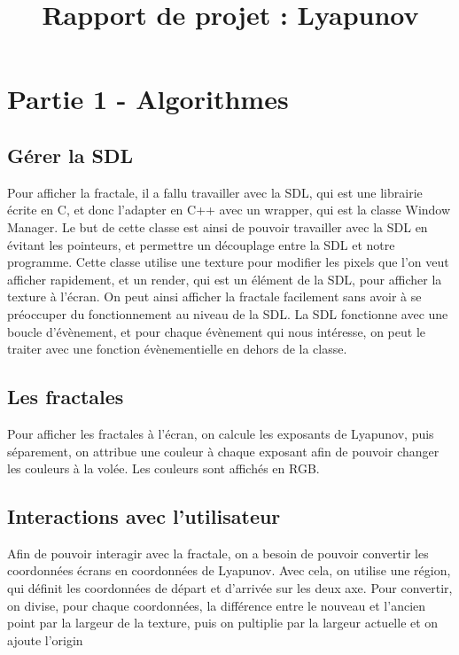 \documentclass{article}
\title{Rapport de projet : Lyapunov}
\date{}
\begin{document}
    \vspace*{-2pt}
    {\let\newpage\relax\maketitle} \thispagestyle{fancy}


\section* {Partie 1 - Algorithmes}
    \subsection*{Gérer la SDL}
    Pour afficher la fractale, il a fallu travailler avec la SDL, qui est une librairie écrite en C, et donc l'adapter en C++ avec un wrapper, qui est la classe Window Manager.
    Le but de cette classe est ainsi de pouvoir travailler avec la SDL en évitant les pointeurs, et permettre un découplage entre la SDL et notre programme.
    Cette classe utilise une texture pour modifier les pixels que l'on veut afficher rapidement, et un render, qui est un élément de la SDL, pour afficher la texture à l'écran.
    On peut ainsi afficher la fractale facilement sans avoir à se préoccuper du fonctionnement au niveau de la SDL.
    La SDL fonctionne avec une boucle d'évènement, et pour chaque évènement qui nous intéresse, on peut le traiter avec une fonction évènementielle en dehors de la classe.

    \subsection*{Les fractales}

    Pour afficher les fractales à l'écran, on calcule les exposants de Lyapunov, puis séparement, on attribue une couleur à chaque exposant afin de pouvoir changer les couleurs à la volée.
    Les couleurs sont affichés en RGB.

    \subsection*{Interactions avec l'utilisateur}

    Afin de pouvoir interagir avec la fractale, on a besoin de pouvoir convertir les coordonnées écrans en coordonnées de Lyapunov.
    Avec cela, on utilise une région, qui définit les coordonnées de départ et d'arrivée sur les deux axe.
    Pour convertir, on divise, pour chaque coordonnées, la différence entre le nouveau et l'ancien point par la largeur de la texture, puis on pultiplie par la largeur actuelle et on ajoute l'origin
\end{document}
